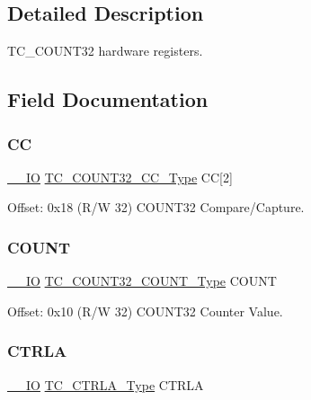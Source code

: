 \subsection{Detailed Description}
T\+C\+\_\+\+C\+O\+U\+N\+T32 hardware registers. 

\subsection{Field Documentation}
\mbox{\label{struct_tc_count32_a0775f63da77974d2a0882ce94fa9acff}} 
\subsubsection{\texorpdfstring{CC}{CC}}
{\footnotesize\ttfamily \mbox{\hyperlink{core__cm0plus_8h_aec43007d9998a0a0e01faede4133d6be}{\+\_\+\+\_\+\+IO}} \mbox{\hyperlink{union_t_c___c_o_u_n_t32___c_c___type}{T\+C\+\_\+\+C\+O\+U\+N\+T32\+\_\+\+C\+C\+\_\+\+Type}} CC\mbox{[}2\mbox{]}}



Offset\+: 0x18 (R/W 32) C\+O\+U\+N\+T32 Compare/\+Capture. 

\mbox{\label{struct_tc_count32_a452553d1482d934c1c9530e31a465d0f}} 
\subsubsection{\texorpdfstring{COUNT}{COUNT}}
{\footnotesize\ttfamily \mbox{\hyperlink{core__cm0plus_8h_aec43007d9998a0a0e01faede4133d6be}{\+\_\+\+\_\+\+IO}} \mbox{\hyperlink{union_t_c___c_o_u_n_t32___c_o_u_n_t___type}{T\+C\+\_\+\+C\+O\+U\+N\+T32\+\_\+\+C\+O\+U\+N\+T\+\_\+\+Type}} C\+O\+U\+NT}



Offset\+: 0x10 (R/W 32) C\+O\+U\+N\+T32 Counter Value. 

\mbox{\label{struct_tc_count32_a282ae6be6071506774ed492a00c9a7c5}} 
\subsubsection{\texorpdfstring{CTRLA}{CTRLA}}
{\footnotesize\ttfamily \mbox{\hyperlink{core__cm0plus_8h_aec43007d9998a0a0e01faede4133d6be}{\+\_\+\+\_\+\+IO}} \mbox{\hyperlink{union_t_c___c_t_r_l_a___type}{T\+C\+\_\+\+C\+T\+R\+L\+A\+\_\+\+Type}} C\+T\+R\+LA}



